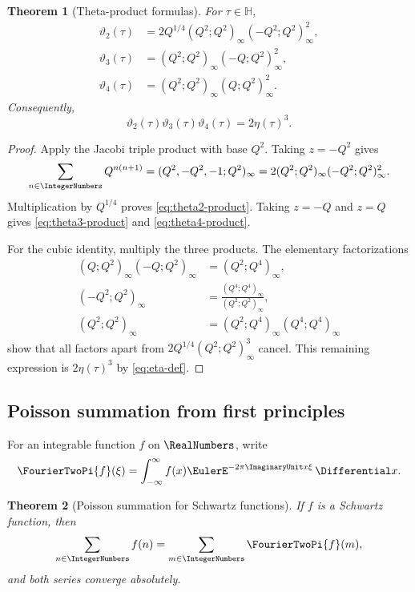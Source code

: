 \documentclass[11pt]{article}
\theoremstyle{blueplain}
\newtheorem{theorem}{Theorem}[section]
\theoremstyle{bluedef}
\begin{document}
\begin{theorem}[Theta-product formulas]\label{thm:theta-products}
For $\tau\in\mathbb H$,
\begin{align}
\vartheta_2(\tau)
 &=2Q^{1/4}(Q^2;Q^2)_\infty(-Q^2;Q^2)_\infty^2, \label{eq:theta2-product}\\
\vartheta_3(\tau)
 &=(Q^2;Q^2)_\infty(-Q;Q^2)_\infty^2, \label{eq:theta3-product}\\
\vartheta_4(\tau)
 &=(Q^2;Q^2)_\infty(Q;Q^2)_\infty^2. \label{eq:theta4-product}
\end{align}
Consequently,
\begin{equation}\label{eq:theta-eta-cubic}
\vartheta_2(\tau)\vartheta_3(\tau)\vartheta_4(\tau)=2\eta(\tau)^3.
\end{equation}
\end{theorem}

\begin{proof}
Apply the Jacobi triple product with base $Q^2$.  Taking $z=-Q^2$ gives
\[
\sum_{n\in\IntegerNumbers}Q^{n(n+1)}=(Q^2,-Q^2,-1;Q^2)_\infty
=2(Q^2;Q^2)_\infty(-Q^2;Q^2)_\infty^2.
\]
Multiplication by $Q^{1/4}$ proves \eqref{eq:theta2-product}.  Taking $z=-Q$ and $z=Q$ gives \eqref{eq:theta3-product} and \eqref{eq:theta4-product}.

For the cubic identity, multiply the three products.  The elementary factorizations
\begin{align*}
(Q;Q^2)_\infty(-Q;Q^2)_\infty&=(Q^2;Q^4)_\infty,\\
(-Q^2;Q^2)_\infty&=\frac{(Q^4;Q^4)_\infty}{(Q^2;Q^2)_\infty},\\
(Q^2;Q^2)_\infty&=(Q^2;Q^4)_\infty(Q^4;Q^4)_\infty
\end{align*}
show that all factors apart from $2Q^{1/4}(Q^2;Q^2)_\infty^3$ cancel.  This remaining expression is $2\eta(\tau)^3$ by \eqref{eq:eta-def}.
\end{proof}

\subsection{Poisson summation from first principles}

For an integrable function $f$ on $\RealNumbers$, write
\[
\FourierTwoPi{f}(\xi)=\int_{-\infty}^{\infty}f(x)\EulerE^{-2\pi\ImaginaryUnit x\xi}\,\Differential x.
\]

\begin{theorem}[Poisson summation for Schwartz functions]\label{thm:poisson}
If $f$ is a Schwartz function, then
\begin{equation}\label{eq:poisson}
\sum_{n\in\IntegerNumbers}f(n)=\sum_{m\in\IntegerNumbers}\FourierTwoPi{f}(m),
\end{equation}
and both series converge absolutely.
\end{theorem}
\end{document}
